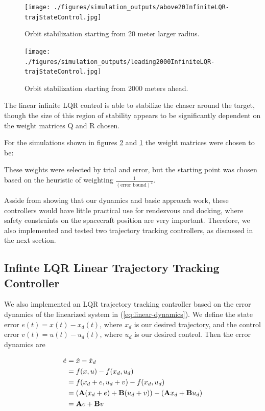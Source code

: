 \documentclass[conference]{IEEEtran}
\begin{document}
\begin{figure}[t]
    \centerline{\texttt{[image: ./figures/simulation\_outputs/above20InfiniteLQR-trajStateControl.jpg]}}
    \caption{Orbit stabilization starting from 20 meter larger radius.}
    \label{fig:above20}
\end{figure}

\begin{figure}[t]
    \centerline{\texttt{[image: ./figures/simulation\_outputs/leading2000InfiniteLQR-trajStateControl.jpg]}}
    \caption{Orbit stabilization starting from 2000 meters ahead.}
    \label{fig:leading2000}
\end{figure}

The linear infinite LQR control is able to stabilize the chaser around the
target, though the size of this region of stability appears to be significantly
dependent on the weight matrices Q and R chosen.

For the simulations shown in figures \ref{fig:leading2000} and
\ref{fig:above20} the weight matrices were chosen to be:


These weights were selected by trial and error, but the starting point was
chosen based on the heuristic of weighting $\frac{1}{(\text{error bound})^2}$.

Asside from showing that our dynamics and basic approach work, these
controllers would have little practical use for rendezvous and docking, where
safety constraints on the spacecraft position are very important. Therefore, we
also implemented and tested two trajectory tracking controllers, as discussed
in the next section.


\subsection{Infinte LQR Linear Trajectory Tracking Controller}

We also implemented an LQR trajectory tracking controller based on the error
dynamics of the linearized system in (\ref{eq:linear-dynamics}). 
We define the state error $e(t) = x(t) - x_d(t)$, where $x_d$ is our desired
trajectory, and the control error $v(t) = u(t) - u_d(t)$, where $u_d$ is our
desired control. Then the error dynamics are

\begin{equation}
    \label{eq:linearize-error-dynamics}
    \begin{split}
        \dot{e} & = \dot{x} - \dot{x}_d \\
                & = f(x, u) - f(x_d, u_d) \\
                & = f(x_d + e, u_d + v) - f(x_d, u_d) \\
                & = ({\bf A}(x_d + e) + {\bf B}(u_d + v)) - ({\bf A}x_d +
                    {\bf B}u_d) \\
                & = {\bf A}e + {\bf B}v
    \end{split}
\end{equation}
\end{document}
